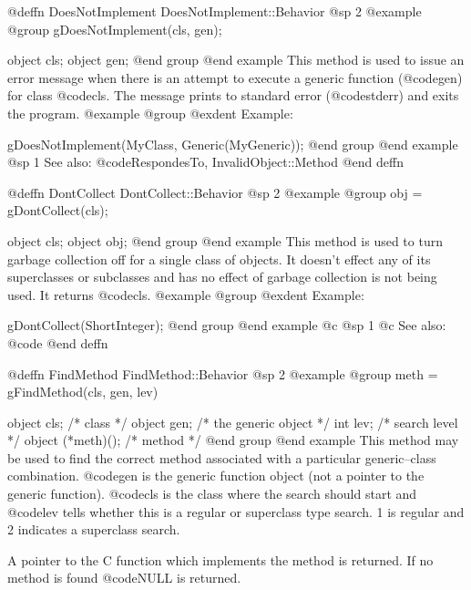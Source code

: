 @deffn {DoesNotImplement} DoesNotImplement::Behavior
@sp 2
@example
@group
gDoesNotImplement(cls, gen);

object  cls;
object  gen;
@end group
@end example
This method is used to issue an error message when there is an attempt 
to execute a generic function (@code{gen}) for class @code{cls}.
The message prints to standard error (@code{stderr}) and exits the program.
@example
@group
@exdent Example:

gDoesNotImplement(MyClass, Generic(MyGeneric));
@end group
@end example
@sp 1
See also:  @code{RespondesTo, InvalidObject::Method}
@end deffn











@deffn {DontCollect} DontCollect::Behavior
@sp 2
@example
@group
obj = gDontCollect(cls);

object  cls;
object  obj;
@end group
@end example
This method is used to turn garbage collection off for a single
class of objects.  It doesn't effect any of its superclasses or subclasses and
has no effect of garbage collection is not being used.  It returns
@code{cls}.
@example
@group
@exdent Example:

gDontCollect(ShortInteger);
@end group
@end example
@c @sp 1
@c See also:  @code{}
@end deffn












@deffn {FindMethod} FindMethod::Behavior
@sp 2
@example
@group
meth = gFindMethod(cls, gen, lev)

object  cls;    /* class                */
object  gen;    /* the generic object   */
int     lev;    /* search level         */
object  (*meth)();  /*  method          */
@end group
@end example
This method may be used to find the correct method associated with a
particular generic--class combination.  @code{gen} is the generic
function object (not a pointer to the generic function).  @code{cls} is
the class where the search should start and @code{lev} tells whether
this is a regular or superclass type search.  1 is regular and 2
indicates a superclass search.

A pointer to the C function which implements the method is returned.  If no
method is found @code{NULL} is returned.


